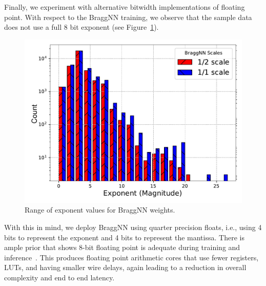Finally, we experiment with alternative bitwidth implementations of floating point.
With respect to the BraggNN training, we observe that the sample data does not use a full 8 bit exponent (see Figure~\ref{fig:numexp}).
\begin{figure}
	\includegraphics[width=\columnwidth]{figures/exp_hist}
	\caption{Range of exponent values for BraggNN weights.}\label{fig:numexp}
\end{figure}
With this in mind, we deploy BraggNN using quarter precision floats, i.e., using 4 bits to represent the exponent and 4 bits to represent the mantissa.
There is ample prior that shows 8-bit floating point is adequate during training and inference~\cite{https://doi.org/10.48550/arxiv.1812.08011, https://doi.org/10.48550/arxiv.2206.02915, https://doi.org/10.48550/arxiv.2001.05674}.
This produces floating point arithmetic cores that use fewer registers, LUTs, and having smaller wire delays, again leading to a reduction in overall complexity and end to end latency.
